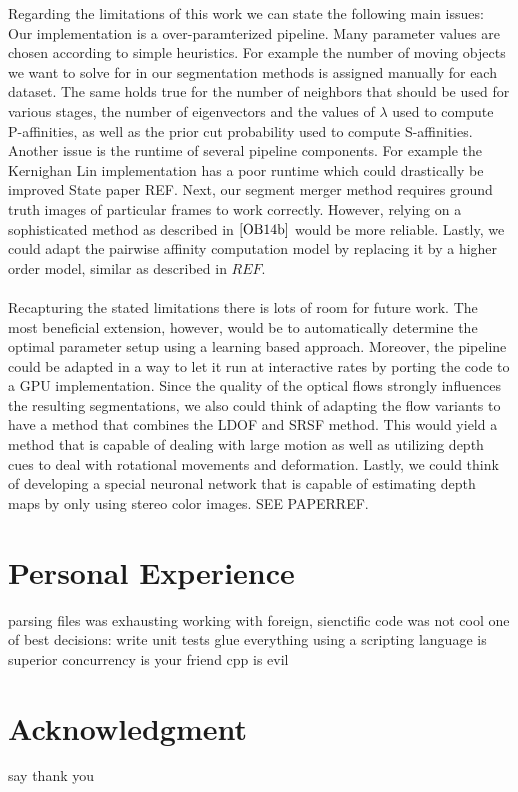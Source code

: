 Regarding the limitations of this work we can state the following main issues: Our implementation is a over-paramterized pipeline. Many parameter values are chosen according to simple heuristics. For example the number of moving objects we want to solve for in our segmentation methods is assigned manually for each dataset. The same holds true for the number of neighbors that should be used for various stages, the number of eigenvectors and the values of $\lambda$ used to compute P-affinities, as well as the prior cut probability used to compute S-affinities. Another issue is the runtime of several pipeline components. For example the Kernighan Lin implementation has a poor runtime which could drastically be improved State paper REF. Next, our segment merger method requires ground truth images of particular frames to work correctly. However, relying on a sophisticated method as described in $\cite{OB14b}$ would be more reliable. Lastly, we could adapt the pairwise affinity computation model by replacing it by a higher order model, similar as described in $REF$. \\ \\
Recapturing the stated limitations there is lots of room for future work.  
The most beneficial extension, however, would be to automatically determine the optimal parameter setup using a learning based approach. Moreover, the pipeline could be adapted in a way to let it run at interactive rates by porting the code to a GPU implementation. Since the quality of the optical flows strongly influences the resulting segmentations, we also could think of adapting the flow variants to have a method that combines the LDOF and SRSF method. This would yield a method that is capable of dealing with large motion as well as utilizing depth cues to deal with rotational movements and deformation. Lastly, we could think of developing a special neuronal network that is capable of estimating depth maps by only using stereo color images. SEE PAPERREF.  

\section{Personal Experience}
parsing files was exhausting
working with foreign, sienctific code was not cool
one of best decisions: write unit tests
glue everything using a scripting language is superior
concurrency is your friend
cpp is evil

\section{Acknowledgment}
say thank you
